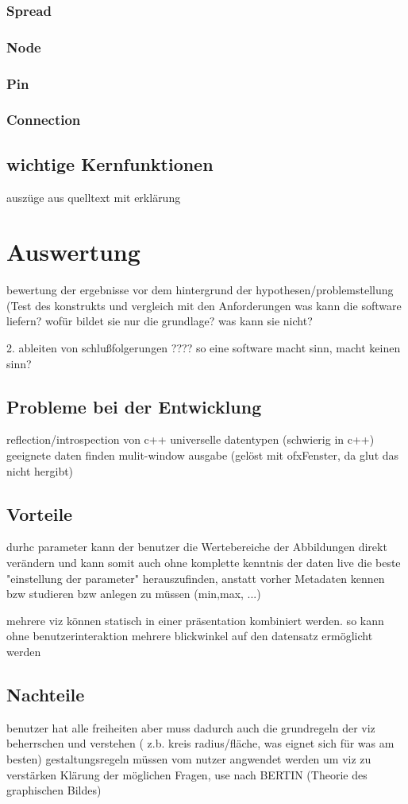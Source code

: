 \documentclass[a4paper, 12pt, onepage, pdftex, headsepline, footsepline]{scrreprt}
\begin{document}
\subsection{Spread}
\subsection{Node}
\subsection{Pin}
\subsection{Connection}
\section{wichtige Kernfunktionen}
auszüge aus quelltext mit erklärung
\chapter{Auswertung}
bewertung der ergebnisse vor dem hintergrund der hypothesen/problemstellung (Test des konstrukts und vergleich mit den Anforderungen
was kann die software liefern? wofür bildet sie nur die grundlage? was kann sie nicht?

2. ableiten von schlußfolgerungen
????
so eine software macht sinn, macht keinen sinn?
\section{Probleme bei der Entwicklung}
reflection/introspection von c++
universelle datentypen (schwierig in c++)
geeignete daten finden
mulit-window ausgabe (gelöst mit ofxFenster, da glut das nicht hergibt)
\section{Vorteile}
durhc parameter kann der benutzer die Wertebereiche der Abbildungen direkt verändern und kann somit auch ohne komplette kenntnis der daten live die beste "einstellung der parameter" herauszufinden, anstatt vorher Metadaten kennen bzw studieren bzw anlegen zu müssen (min,max, ...)

mehrere viz können statisch in einer präsentation kombiniert werden. so kann ohne benutzerinteraktion mehrere blickwinkel auf den datensatz ermöglicht werden

\section{Nachteile}
benutzer hat alle freiheiten aber muss dadurch auch die grundregeln der viz beherrschen und verstehen ( z.b. kreis radius/fläche, was eignet sich für was am besten)
gestaltungsregeln müssen vom nutzer angwendet werden um viz zu verstärken
Klärung der möglichen Fragen, use nach BERTIN (Theorie des graphischen Bildes)
\end{document}
